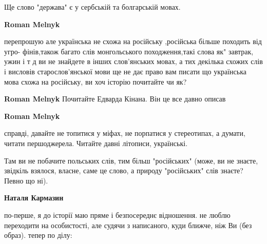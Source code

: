 \begin{itemize}
\begin{itemize}
Ще слово "держава" є у сербській та болгарській мовах.

 
\textbf{Roman Melnyk} 

перепрошую але українська не схожа на російську ,російська більше походить від
угро- фінів,також багато слів монгольського походження,такі слова як" завтрак,
ужин і т д ви не знайдете в інших слов'янських мовах, а тих декілька схожих
слів і висловів старослов'янської мови ще не дає право вам писати що українська
мова схожа на російську, ви хоч історію почитайте чи як?


 
\textbf{Roman Melnyk} Почитайте Едварда Кінана. Він це все давно описав

 
\textbf{Roman Melnyk} 

справді, давайте не топитися у міфах, не порпатися у стереотипах, а думати,
читати першоджерела. Читайте давні літописи, українські. 

Там ви не побачите польських слів, тим більш "російських" (може, ви не знаєте,
звідкіль взялося, власне, саме це слово, а природу "російських" слів знаєте?
Певно що ні).


 
\textbf{Наталя Кармазин} 

по-перше, я до історії маю пряме і безпосереднє відношення. не люблю переходити
на особистості, але судячи з написаного, куди ближче, ніж Ви (без образ). тепер
по ділу:


\end{itemize}
\end{itemize}
